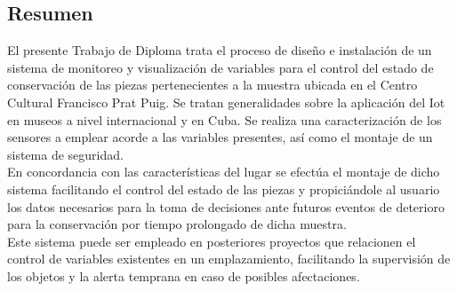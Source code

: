 \begin{center}
    \section*{Resumen}\label{sec: resumen}
\end{center}

El presente Trabajo de Diploma trata el proceso de diseño e instalación de un sistema de monitoreo y visualización de variables para el control del estado de conservación de las piezas pertenecientes a la muestra ubicada en el Centro Cultural Francisco Prat Puig. Se tratan generalidades sobre la aplicación del Iot en museos a nivel internacional y en Cuba. Se realiza una caracterización de los sensores a emplear acorde a las variables presentes, así como el montaje de un sistema de seguridad.\\
En concordancia con las características del lugar se efectúa el montaje de dicho sistema facilitando el control del estado de las piezas y propiciándole al usuario los datos necesarios para la toma de decisiones ante futuros eventos de deterioro para la conservación por tiempo prolongado de dicha muestra.\\
Este sistema puede ser empleado en posteriores proyectos que relacionen el control de variables existentes en un emplazamiento, facilitando la supervisión de los objetos y la alerta temprana en caso de posibles afectaciones. 
 
